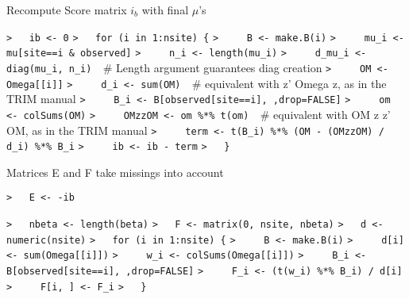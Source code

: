 \documentclass[a4paper]{article}
\begin{document}
Recompute Score matrix $i_b$ with final $\mu$'s\par
\verb~>   ib <- 0~\newline
\verb~>   for (i in 1:nsite) {~\newline
\verb~>     B <- make.B(i)~\newline
\verb~>     mu_i <- mu[site==i & observed]~\newline
\verb~>     n_i <- length(mu_i)~\newline
\verb~>     d_mu_i <- diag(mu_i, n_i)  ~{\sffamily\# Length argument guarantees diag creation}\newline
\verb~>     OM <- Omega[[i]]~\newline
\verb~>     d_i <- sum(OM)  ~{\sffamily\# equivalent with z' Omega z, as in the TRIM manual}\newline
\verb~>     B_i <- B[observed[site==i], ,drop=FALSE]~\newline
\verb~>     om <- colSums(OM)~\newline
\verb~>     OMzzOM <- om %*% t(om)  ~{\sffamily\# equivalent with OM z z' OM, as in the TRIM manual}\newline
\verb~>     term <- t(B_i) %*% (OM - (OMzzOM) / d_i) %*% B_i~\newline
\verb~>     ib <- ib - term~\newline
\verb~>   }~\par



Matrices E and F take missings into account\par
\verb~>   E <- -ib~\par

\verb~>   nbeta <- length(beta)~\newline
\verb~>   F <- matrix(0, nsite, nbeta)~\newline
\verb~>   d <- numeric(nsite)~\newline
\verb~>   for (i in 1:nsite) {~\newline
\verb~>     B <- make.B(i)~\newline
\verb~>     d[i] <- sum(Omega[[i]])~\newline
\verb~>     w_i <- colSums(Omega[[i]])~\newline
\verb~>     B_i <- B[observed[site==i], ,drop=FALSE]~\newline
\verb~>     F_i <- (t(w_i) %*% B_i) / d[i]~\newline
\verb~>     F[i, ] <- F_i~\newline
\verb~>   }~\par
\end{document}
